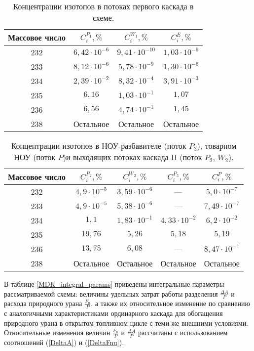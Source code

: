\begin{table}[ht]
    \centering
    \caption{Концентрации изотопов в потоках первого каскада в схеме.}\label{MDKcas1params}
    \begin{tabular}{|c|c|c|c|}
        \hline Массовое число & $C_{i}^{P_{1}}, \%$ & $C_{i}^{W_{1}}, \%$ & $C_{i}^{E}, \%$\\\hline 
        232 & $6,42\cdot10^{-6}$ & $9,41\cdot10^{-10}$ & $1,03\cdot10^{-6}$\\
        233 & $8,12\cdot10^{-6}$ & $5,78\cdot10^{-9}$ & $1,30\cdot10^{-6}$\\
        234 & $2,39\cdot10^{-2}$ & $8,32\cdot10^{-4}$ & $3,91\cdot10^{-3}$\\
        235 & $6,16$ & $1,03\cdot10^{-1}$ & $1,07$\\
        236 & $6,56$ & $4,74\cdot10^{-1}$ & $1,45$\\
        238 & Остальное & Остальное & Остальное\\
        \hline
    \end{tabular}
\end{table}

\begin{table}[ht]
    \centering
    \caption{Концентрации изотопов в НОУ-разбавителе (поток $P_{3}$), товарном НОУ (поток $P$)и выходящих потоках каскада II (поток $P_{2}$, $W_{2}$).}\label{MDKcas2params}
    \begin{tabular}{|c|c|c|c|c|}
        \hline Массовое число & $C_{i}^{P_{2}}, \%$ & $C_{i}^{W_{2}}, \%$ & $C_{i}^{P_{3}}, \%$ & $C_{i}^{P}, \%$\\
        \hline 232 & $4,9\cdot10^{-5}$ & $3,59\cdot10^{-6}$ & --- & $5,0\cdot10^{-7}$\\
        233 & $4,9\cdot10^{-5}$ & $5,38\cdot10^{-6}$ & --- & $7,49\cdot10^{-7}$\\
        234 & $1,1$ & $1,83\cdot10^{-1}$ & $4,33\cdot10^{-2}$ & $6,2\cdot10^{-2}$\\
        235 & $19,76$ & $5,26$ & $5,18$  & $5,19$\\
        236 & $13,75$ & $6,08$ & ---  & $8,47\cdot10^{-1}$\\
        238 & Остальное & Остальное & Остальное  & Остальное\\
        \hline
\end{tabular}
\end{table}

В таблице \ref{MDK_integral_params} приведены интегральные параметры рассматриваемой схемы: величины удельных затрат работы разделения $\frac{\Delta A}{P}$ и расхода природного урана $\frac{F_n}{P}$, а также их относительное изменение по сравнению с аналогичными характеристиками ординарного каскада для обогащения природного урана в открытом топливном цикле с теми же внешними условиями. Относительные изменения величин $\frac{F_n}{P}$ и $\frac{\Delta A}{P}$ рассчитаны с использованием соотношений (\ref{DeltaA}) и (\ref{DeltaFnu}).

